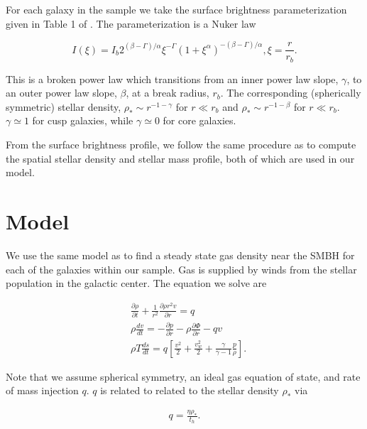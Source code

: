 \documentclass[usenatbib,fleqn]{mn2e}
\newcommand{\rb}{r_b}
\newcommand{\dxdy}[2]{\frac{\partial #1}{\partial #2} }
\newcommand{\drhodt}{\dxdy{\rho}{t}}
\newcommand{\dpdr}{\dxdy{p}{r}}
\newcommand{\dphidr}{\dxdy{\Phi}{r}}
\newcommand{\ke}{\frac{v^2}{2}}
\newcommand{\kew}{\frac{v_w^2}{2}}
\newcommand{\gammaf}{\frac{\gamma}{\gamma-1}}
\newcommand{\cs}{\frac{p}{\rho}}
\newcommand{\rhostar}{\rho_*}
\renewcommand{\th}{t_h}
\begin{document}
For each galaxy in the sample we take the surface brightness
parameterization given in Table 1 of
. The parameterization is a Nuker law

\begin{equation}
  I(\xi)=I_b 2^{(\beta-\Gamma)/\alpha} \xi^{-\Gamma} (1+\xi^\alpha)^{-(\beta-\Gamma)/\alpha}, \xi=\frac{r}{r_b}.
\end{equation}

This is a broken power law which transitions from an inner power law
slope, $\gamma$, to an outer power law slope, $\beta$, at a break
radius, $\rb$.  The corresponding (spherically symmetric) stellar
density, $\rhostar\sim r^{-1-\gamma}$ for $r \ll \rb$ and
$\rhostar\sim r^{-1-\beta}$ for $r \ll \rb$.  $\gamma\simeq1$ for cusp
galaxies, while $\gamma\simeq0$ for core galaxies.

From the surface brightness profile, we follow the same procedure as
 to compute the spatial stellar density
and stellar mass profile, both of which are used in our model.


\section{Model}
\label{sec:model}
We use the same model as \citealt{Quataert:2004a} to find a steady
state gas density near the SMBH for each of the galaxies within our
sample.  Gas is supplied by winds from the stellar population in the
galactic center. The equation we solve are 


\begin{align}
  &\drhodt+\frac{1}{r^2}\dxdy{\rho r^2 v}{r}=q\\
  &\rho \frac{dv}{dt}=-\dpdr-\rho \dphidr-q v\\
  &\rho T \frac{ds}{dt}=q\left[\ke+\kew+\gammaf \cs \right].
\end{align}

Note that we assume spherical symmetry, an ideal gas equation of
state, and rate of mass injection $q$. $q$ is related to related to
the stellar density $\rhostar$ via

\begin{align}
  q=\frac{\eta \rho_*}{\th}.
\end{align}
\end{document}
